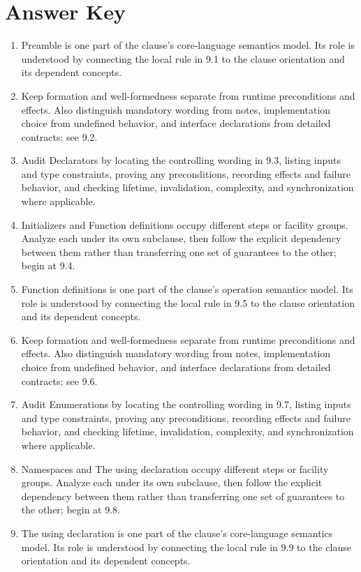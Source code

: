 \documentclass[11pt,letterpaper]{article}
\begin{document}
\clearpage\section{Answer Key}
\begin{enumerate}
\item Preamble is one part of the clause's core-language semantics model. Its role is understood by connecting the local rule in 9.1 to the clause orientation and its dependent concepts.
\item Keep formation and well-formedness separate from runtime preconditions and effects. Also distinguish mandatory wording from notes, implementation choice from undefined behavior, and interface declarations from detailed contracts; see 9.2.
\item Audit Declarators by locating the controlling wording in 9.3, listing inputs and type constraints, proving any preconditions, recording effects and failure behavior, and checking lifetime, invalidation, complexity, and synchronization where applicable.
\item Initializers and Function definitions occupy different steps or facility groups. Analyze each under its own subclause, then follow the explicit dependency between them rather than transferring one set of guarantees to the other; begin at 9.4.
\item Function definitions is one part of the clause's operation semantics model. Its role is understood by connecting the local rule in 9.5 to the clause orientation and its dependent concepts.
\item Keep formation and well-formedness separate from runtime preconditions and effects. Also distinguish mandatory wording from notes, implementation choice from undefined behavior, and interface declarations from detailed contracts; see 9.6.
\item Audit Enumerations by locating the controlling wording in 9.7, listing inputs and type constraints, proving any preconditions, recording effects and failure behavior, and checking lifetime, invalidation, complexity, and synchronization where applicable.
\item Namespaces and The using declaration occupy different steps or facility groups. Analyze each under its own subclause, then follow the explicit dependency between them rather than transferring one set of guarantees to the other; begin at 9.8.
\item The using declaration is one part of the clause's core-language semantics model. Its role is understood by connecting the local rule in 9.9 to the clause orientation and its dependent concepts.

\end{enumerate}
\end{document}
